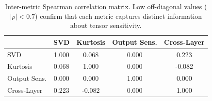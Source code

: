 \begin{table}[t]
\centering
\caption{Inter-metric Spearman correlation matrix. Low off-diagonal values ($|\rho| < 0.7$) confirm that each metric captures distinct information about tensor sensitivity.}
\label{tab:inter_metric}
\begin{tabular}{lcccc}
\toprule
  & SVD & Kurtosis & Output Sens. & Cross-Layer \\
\midrule
  SVD & 1.000 & 0.068 & 0.000 & 0.223 \\
  Kurtosis & 0.068 & 1.000 & 0.000 & -0.082 \\
  Output Sens. & 0.000 & 0.000 & 1.000 & 0.000 \\
  Cross-Layer & 0.223 & -0.082 & 0.000 & 1.000 \\
\bottomrule
\end{tabular}
\end{table}